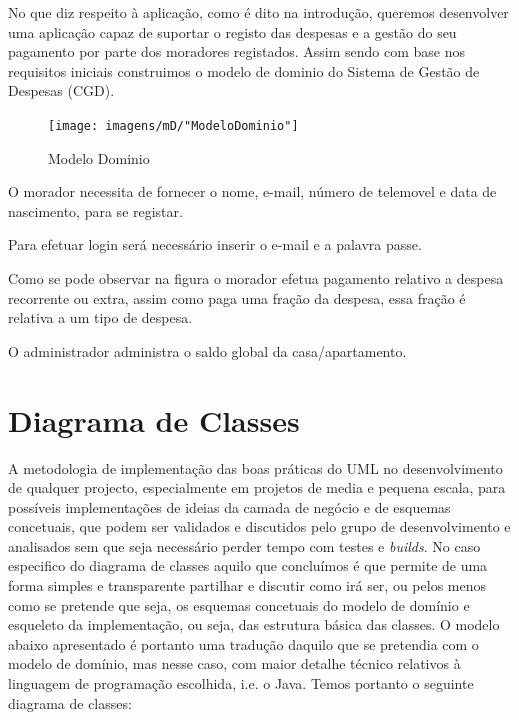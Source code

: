 No que diz respeito à aplicação, como é dito na introdução, queremos desenvolver uma aplicação capaz de suportar o registo das despesas e a gestão do seu pagamento por parte dos moradores registados. Assim sendo com base nos requisitos iniciais construimos o modelo de dominio do Sistema de Gestão de Despesas (CGD). 


\begin{figure}[htb!]
	\texttt{[image: imagens/mD/"ModeloDominio"]}  
	\caption{Modelo Dominio}  
\end{figure}

O morador necessita de fornecer o nome, e-mail, número de telemovel e data de nascimento, para se registar. 

Para efetuar login será necessário inserir o e-mail e a palavra passe. 

Como se pode observar na figura o morador efetua pagamento relativo a despesa recorrente ou extra, assim como paga uma fração da despesa, essa fração é relativa a um tipo de despesa. 


O administrador administra o saldo global da casa/apartamento. 


\newpage

\section{Diagrama de Classes}
A metodologia de implementação das boas práticas do UML no desenvolvimento de qualquer
projecto, especialmente em projetos de media e pequena escala, para possíveis implementações de ideias da camada de negócio e de esquemas concetuais, que podem ser validados e discutidos pelo grupo de desenvolvimento e analisados sem que seja necessário perder tempo com testes e \textit{builds}.
No caso especifico do diagrama de classes aquilo que concluímos é que permite de uma forma simples e transparente partilhar e discutir como irá ser, ou pelos menos como se pretende que seja, os esquemas concetuais do modelo de domínio e esqueleto da implementação, ou seja, das estrutura básica das classes. O modelo abaixo apresentado é portanto uma tradução daquilo que se pretendia com o modelo de domínio, mas nesse caso, com maior detalhe técnico relativos à linguagem de programação escolhida, i.e. o Java. Temos portanto o seguinte diagrama de classes:

